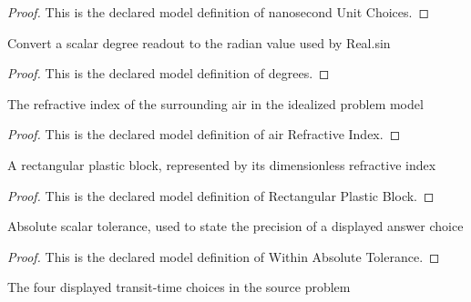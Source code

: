 \begin{proof}
  This is the declared model definition of nanosecond Unit Choices.
\end{proof}
\begin{definition}[degrees]
  \label{def:physics:phyx-mini-0023:phyxminiproblems-problemphyxmini0023-degrees}
  Convert a scalar degree readout to the radian value used by Real.sin
\end{definition}
\begin{proof}
  This is the declared model definition of degrees.
\end{proof}
\begin{definition}
  \label{def:physics:phyx-mini-0023:phyxminiproblems-problemphyxmini0023-airrefractiveindex}
  The refractive index of the surrounding air in the idealized problem model
\end{definition}
\begin{proof}
  This is the declared model definition of air Refractive Index.
\end{proof}
\begin{definition}
  \label{def:physics:phyx-mini-0023:phyxminiproblems-problemphyxmini0023-rectangularplasticblock}
  A rectangular plastic block, represented by its dimensionless refractive index
\end{definition}
\begin{proof}
  This is the declared model definition of Rectangular Plastic Block.
\end{proof}
\begin{definition}
  \label{def:physics:phyx-mini-0023:phyxminiproblems-problemphyxmini0023-withinabsolutetolerance}
  Absolute scalar tolerance, used to state the precision of a displayed answer choice
\end{definition}
\begin{proof}
  This is the declared model definition of Within Absolute Tolerance.
\end{proof}
\begin{definition}
  \label{def:physics:phyx-mini-0023:phyxminiproblems-problemphyxmini0023-answerchoice}
  The four displayed transit-time choices in the source problem
\end{definition}
